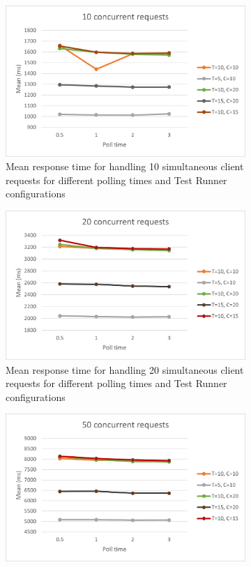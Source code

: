 \begin{figure}
  \centering
  \begin{subfigure}[b]{0.45\textwidth}
      \centering
      \includegraphics[width=\textwidth]{images/10.png}
      \caption{Mean response time for handling 10 simultaneous client requests for different polling times and Test Runner configurations}
      \label{fig:resultstart}
  \end{subfigure}
  \hfill
  \begin{subfigure}[b]{0.45\textwidth}
    \centering
    \includegraphics[width=\textwidth]{images/20.png}
    \caption{Mean response time for handling 20 simultaneous client requests for different polling times and Test Runner configurations}
  \end{subfigure}
  \hfill
  \begin{subfigure}[b]{0.45\textwidth}
    \centering
    \includegraphics[width=\textwidth]{images/50.png}

\end{subfigure}
\end{figure}
